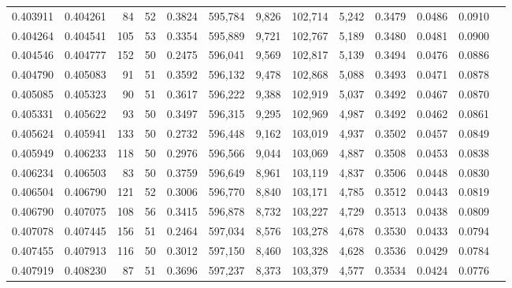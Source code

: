 \begin{tabular}{rrrrrrrrrrrrr}
0.403911 & 0.404261 &    84 &  52 &                                     0.3824 & 595,784 &   9,826 & 102,714 &   5,242 & 0.3479 & 0.0486 & 0.0910 \\
0.404264 & 0.404541 &   105 &  53 &                                     0.3354 & 595,889 &   9,721 & 102,767 &   5,189 & 0.3480 & 0.0481 & 0.0900 \\
0.404546 & 0.404777 &   152 &  50 &                                     0.2475 & 596,041 &   9,569 & 102,817 &   5,139 & 0.3494 & 0.0476 & 0.0886 \\
0.404790 & 0.405083 &    91 &  51 &                                     0.3592 & 596,132 &   9,478 & 102,868 &   5,088 & 0.3493 & 0.0471 & 0.0878 \\
0.405085 & 0.405323 &    90 &  51 &                                     0.3617 & 596,222 &   9,388 & 102,919 &   5,037 & 0.3492 & 0.0467 & 0.0870 \\
0.405331 & 0.405622 &    93 &  50 &                                     0.3497 & 596,315 &   9,295 & 102,969 &   4,987 & 0.3492 & 0.0462 & 0.0861 \\
0.405624 & 0.405941 &   133 &  50 &                                     0.2732 & 596,448 &   9,162 & 103,019 &   4,937 & 0.3502 & 0.0457 & 0.0849 \\
0.405949 & 0.406233 &   118 &  50 &                                     0.2976 & 596,566 &   9,044 & 103,069 &   4,887 & 0.3508 & 0.0453 & 0.0838 \\
0.406234 & 0.406503 &    83 &  50 &                                     0.3759 & 596,649 &   8,961 & 103,119 &   4,837 & 0.3506 & 0.0448 & 0.0830 \\
0.406504 & 0.406790 &   121 &  52 &                                     0.3006 & 596,770 &   8,840 & 103,171 &   4,785 & 0.3512 & 0.0443 & 0.0819 \\
0.406790 & 0.407075 &   108 &  56 &                                     0.3415 & 596,878 &   8,732 & 103,227 &   4,729 & 0.3513 & 0.0438 & 0.0809 \\
0.407078 & 0.407445 &   156 &  51 &                                     0.2464 & 597,034 &   8,576 & 103,278 &   4,678 & 0.3530 & 0.0433 & 0.0794 \\
0.407455 & 0.407913 &   116 &  50 &                                     0.3012 & 597,150 &   8,460 & 103,328 &   4,628 & 0.3536 & 0.0429 & 0.0784 \\
0.407919 & 0.408230 &    87 &  51 &                                     0.3696 & 597,237 &   8,373 & 103,379 &   4,577 & 0.3534 & 0.0424 & 0.0776 \\

\end{tabular}
